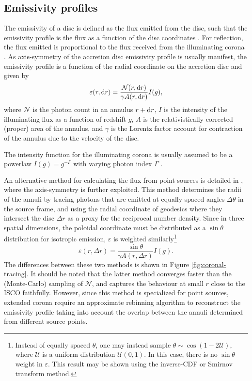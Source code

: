 \subsection{Emissivity profiles}

The emissivity of a disc is defined as the flux emitted from the disc, such that the emissivity profile is the flux as a function of the disc coordinates \citep{wilkins_understanding_2012}. For reflection, the flux emitted is proportional to the flux received from the illuminating corona \citep{laor_line_1991}. As axis-symmetry of the accretion disc emissivity profile is usually manifest, the emissivity profile is a function of the radial coordinate on the accretion disc and given by
\begin{equation}
    \varepsilon (r, \text{d} r) = \frac{\mathcal{N}(r, \text{d} r)}{\gamma A(r, \text{d} r)} I(g),
\end{equation}
where $\mathcal{N}$ is the photon count in an annulus $r + \text{d} r$, $I$ is the intensity of the illuminating flux as a function of redshift $g$, $A$ is the relativistically corrected (proper) area of the annulus, and $\gamma$ is the Lorentz factor account for contraction of the annulus due to the velocity of the disc.

The intensity function for the illuminating corona is usually assumed to be a powerlaw $I(g) = g^{-\Gamma}$ with varying photon index $\Gamma$ \citep{gonzalez_probing_2017}.

An alternative method for calculating the flux from point sources is detailed in \cite{dauser_irradiation_2013}, where the axis-symmetry is further exploited. This method determines the radii of the annuli by tracing photons that are emitted at equally spaced angles $\Delta \theta$ in the source frame, and using the radial coordinate of geodesics where they intersect the disc $\Delta r$ as a proxy for the reciprocal number density. Since in three spatial dimensions, the poloidal coordinate must be distributed as a $\sin \theta$ distribution for isotropic emission, $\varepsilon$ is weighted similarly\footnote{Instead of equally spaced $\theta$, one may instead sample $\theta \sim \cos (1 - 2 \mathcal{U})$, where $\mathcal{U}$ is a uniform distribution $\mathcal{U}(0,1)$. In this case, there is no $\sin \theta$ weight in $\varepsilon$. This result may be shown using the inverse-CDF or Smirnov transform method.}
\begin{equation}
    \varepsilon(r, \Delta r) = \frac{\sin \theta}{\gamma A(r, \Delta r)} I(g).
\end{equation}
The differences between these two methods is shown in Figure \ref{fig:coronal-tracing}. It should be noted that the latter method converges faster than the (Monte-Carlo) sampling of $\mathcal{N}$, and captures the behaviour at small $r$ close to the ISCO faithfully. However, since this method is specialized for point sources, extended corona require an approximate rebinning algorithm to reconstruct the emissivity profile taking into account the overlap between the annuli determined from different source points.

